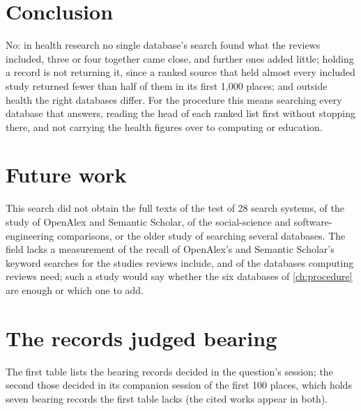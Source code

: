 \section{Conclusion}
\label{sec:databases-conclusion}

No: in health research no single database's search found what the
reviews included, three or four together came close, and further ones
added
little; holding a record is not returning it, since a ranked source that
held almost every included study returned fewer than half of them in its
first 1,000 places; and outside health the right databases differ.
For the procedure this means searching every database that answers,
reading the head of each ranked list first without stopping there, and
not carrying the health figures over to computing or education.

\section{Future work}
\label{sec:databases-future}

This search did not obtain the full texts of the test of 28 search
systems, of the study of OpenAlex and Semantic Scholar, of the
social-science and software-engineering comparisons, or the older study
of searching several databases.
The field lacks a measurement of the recall of OpenAlex's and Semantic
Scholar's keyword searches for the studies reviews include, and of the
databases computing reviews need; such a study would say whether the
six databases of \cref{ch:procedure} are enough or which one to add.

\section{The records judged bearing}
\label{sec:databases-hits}

The first table lists the bearing records decided in the question's
session; the second those decided in its companion session of the first
100 places, which holds seven bearing records the first table lacks (the
cited works appear in both).



